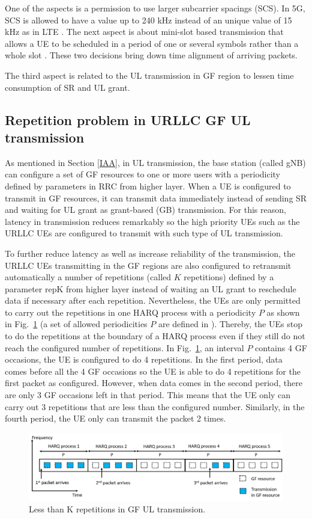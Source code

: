 \documentclass[conference]{IEEEtran}
\begin{document}
One of the aspects is a permission to use larger subcarrier spacings (SCS). In 5G, SCS is allowed to have a value up to 240 kHz instead of an unique value of 15 kHz as in LTE \cite{ad2}. The next aspect is about mini-slot based transmission that allows a UE to be scheduled in a period of one or several symbols rather than a whole slot \cite{ad3}. These two decisions bring down time alignment of arriving packets.

The third aspect is related to the UL transmission in GF region to lessen time consumption of SR and UL grant\cite{ad4}.

\subsection{Repetition problem in URLLC GF UL transmission}\label{IBB}
As mentioned in Section \ref{IAA}, in UL transmission, the base station (called gNB) can configure a set of GF resources to one or more users with a periodicity defined by parameters in RRC from higher layer. When a UE is configured to transmit in GF resources, it can transmit data immediately instead of sending SR and waiting for UL grant as grant-based (GB) transmission. For this reason, latency in transmission reduces remarkably so the high priority UEs such as the URLLC UEs are configured to transmit with such type of UL transmission.

To further reduce latency as well as increase reliability of the transmission, the URLLC UEs transmitting in the GF regions are also configured to retransmit automatically a number of repetitions (called $K$ repetitions) defined by a parameter repK from higher layer instead of waiting an UL grant to reschedule data if necessary after each repetition. Nevertheless, the UEs are only permitted to carry out the repetitions in one HARQ process with a periodicity $P$ as shown in Fig.~\ref{fig1} (a set of allowed periodicities $P$ are defined in \cite{ad5}). Thereby, the UEs stop to do the repetitions at the boundary of a HARQ process even if they still do not reach the configured number of repetitions. In Fig.~\ref{fig1}, an interval $P$ contains 4 GF occasions, the UE is configured to do 4 repetitions. In the first period, data comes before all the 4 GF occasions so the UE is able to do 4 repetitions for the first packet as configured. However, when data comes in the second period, there are only 3 GF occasions left in that period. This means that the UE only can carry out 3 repetitions that are less than the configured number. Similarly, in the fourth period, the UE only can transmit the packet 2 times. 
\begin{figure}[htbp]
\centerline{\includegraphics[scale=0.27]{fig1.png}}
\caption{Less than K repetitions in GF UL transmission.}
\label{fig1}
\vspace{-4mm}
\end{figure}
\end{document}
